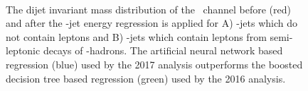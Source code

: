 \begin{figure}[htbp]
  \centering
  \mbox{
     \qquad
     \qquad
  }
  \caption[Performance of \qrkb-jet Energy Regression]{The dijet invariant mass distribution of the \ZllH\ channel before (red) and after the \qrkb-jet energy regression is applied for A) \qrkb-jets which do not contain leptons and B) \qrkb-jets which contain leptons from semi-leptonic decays of \qrkb-hadrons. The artificial neural network based regression (blue) used by the 2017 analysis outperforms the boosted decision tree based regression (green) used by the 2016 analysis.}
    \label{fig:bjetreg_perf}
\end{figure}

